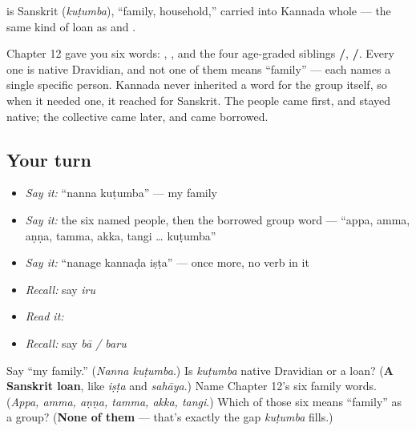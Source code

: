 \begin{cousinweb}
\textbf{} is Sanskrit \textbf{} (\emph{kuṭumba}), \textquotedblleft{}family, household,\textquotedblright{} carried into Kannada whole — the same kind of loan as \textbf{} and \textbf{}.

Chapter 12 gave you six words: \textbf{}, \textbf{}, and the four age-graded siblings \textbf{/}, \textbf{/}. Every one is native Dravidian, and not one of them means \textquotedblleft{}family\textquotedblright{} — each names a single specific person. Kannada never inherited a word for the group itself, so when it needed one, it reached for Sanskrit. The people came first, and stayed native; the collective came later, and came borrowed.
\end{cousinweb}

\subsection*{Your turn}
\begin{itemize}
\raggedright
  \item \emph{Say it:} \textquotedblleft{}nanna kuṭumba\textquotedblright{} — my family
  \item \emph{Say it:} the six named people, then the borrowed group word — \textquotedblleft{}appa, amma, aṇṇa, tamma, akka, tangi … kuṭumba\textquotedblright{}
  \item \emph{Say it:} \textquotedblleft{}nanage kannaḍa iṣṭa\textquotedblright{} — once more, no verb in it
  \item \emph{Recall:} say \emph{iru}
  \item \emph{Read it:} \textbf{}
  \item \emph{Recall:} say \emph{bā / baru}
\end{itemize}

\begin{tcolorbox}[breakable,colback=teal!4,colframe=teal!35!black,title={Before you move on}]
Say \textquotedblleft{}my family.\textquotedblright{} (\emph{Nanna kuṭumba}.) Is \emph{kuṭumba} native Dravidian or a loan? (\textbf{A Sanskrit loan}, like \emph{iṣṭa} and \emph{sahāya}.) Name Chapter 12's six family words. (\emph{Appa, amma, aṇṇa, tamma, akka, tangi}.) Which of those six means \textquotedblleft{}family\textquotedblright{} as a group? (\textbf{None of them} — that's exactly the gap \emph{kuṭumba} fills.)
\end{tcolorbox}

